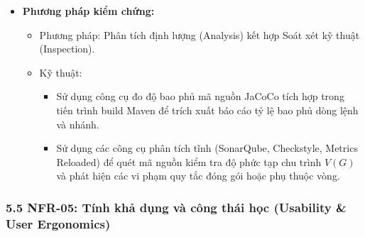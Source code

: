 \documentclass[11pt,a4paper]{article}
\providecommand{\tightlist}{
  \setlength{\itemsep}{0pt}\setlength{\parskip}{0pt}}
\begin{document}
\begin{itemize}
  \begin{itemize}
  \tightlist
  \item
    Độ bao phủ dòng lệnh kiểm thử đơn vị (Line Coverage) tầng nghiệp vụ:
    \(\ge 80\%\).
  \item
    Độ bao phủ nhánh điều kiện (Branch Coverage) tầng nghiệp vụ:
    \(\ge 75\%\).
  \item
    Độ phức tạp chu trình của phương thức (\(V(G)\)): \(V(G) \le 10\)
    trên 100\% các phương thức nghiệp vụ.
  \item
    Mức độ phụ thuộc vòng giữa các gói mã nguồn (Cyclic Package
    Dependencies): 0 vòng phụ thuộc.
  \item
    Tỷ lệ áp dụng sao chép phòng thủ đối với các tập hợp dữ liệu biến
    đổi: 100\%.
  \end{itemize}
\item
  \textbf{Phương pháp kiểm chứng:}

  \begin{itemize}
  \tightlist
  \item
    Phương pháp: Phân tích định lượng (Analysis) kết hợp Soát xét kỹ
    thuật (Inspection).
  \item
    Kỹ thuật:

    \begin{itemize}
    \tightlist
    \item
      Sử dụng công cụ đo độ bao phủ mã nguồn JaCoCo tích hợp trong tiến
      trình build Maven để trích xuất báo cáo tỷ lệ bao phủ dòng lệnh và
      nhánh.
    \item
      Sử dụng các công cụ phân tích tĩnh (SonarQube, Checkstyle, Metrics
      Reloaded) để quét mã nguồn kiểm tra độ phức tạp chu trình \(V(G)\)
      và phát hiện các vi phạm quy tắc đóng gói hoặc phụ thuộc vòng.
    \end{itemize}
  \end{itemize}
\end{itemize}

\subsubsection{5.5 NFR-05: Tính khả dụng và công thái học (Usability \&
User
Ergonomics)}\label{55-nfr-05-tuxednh-khux1ea3-dux1ee5ng-vuxe0-cuxf4ng-thuxe1i-hux1ecdc-usability--user-ergonomics}
\end{document}
